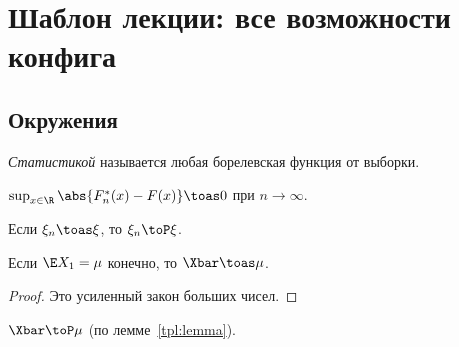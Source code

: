%

\section[Шаблон лекции]{Шаблон лекции: все возможности конфига}
\label{tpl:lecture}

\subsection{Окружения}


\begin{definition}
  \emph{Статистикой} называется любая борелевская функция от выборки.
\end{definition}

\begin{theorem}
  \label{tpl:glivenko}
  $\sup_{x \in \R} \abs{F_n^*(x) - F(x)} \toas 0$ \textup{при} $n \to \infty$.
\end{theorem}

\begin{lemma}
  \label{tpl:lemma}
  Если $\xi_n \toas \xi$, то $\xi_n \toP \xi$.
\end{lemma}

\begin{proposition}
  \label{tpl:xbar}
  Если $\E X_1 = \mu$ конечно, то $\Xbar \toas \mu$.
\end{proposition}

\begin{proof}
  Это усиленный закон больших чисел.
\end{proof}

\begin{corollary}
  $\Xbar \toP \mu$ (по лемме~\ref{tpl:lemma}).
\end{corollary}

